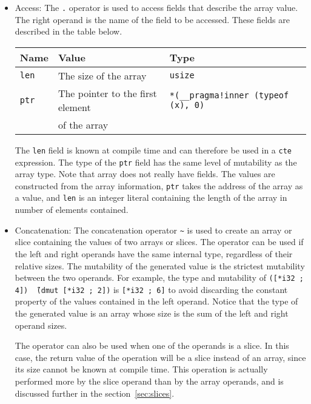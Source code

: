 \begin{itemize}
\item Access: The \texttt{.} operator is used to access fields that describe the
  array value. The right operand is the name of the field to be accessed. These
  fields are described in the table below.

\begin{center}\begin{adjustbox}{max width=\linewidth}
  \begin{tabular}{|l|ll|}
    \hline
    Name & Value & Type\\
    \hline
    \hline
    \texttt{len} & The size of the array & \texttt{usize} \\
    \texttt{ptr} & The pointer to the first element  & \texttt{*(\_\_pragma!inner (typeof (x), 0)} \\
    & of the array & \\
    \hline
  \end{tabular}
\end{adjustbox}\end{center}

The \texttt{len} field is known at compile time and can therefore be used in
a \texttt{cte} expression. The type of the \texttt{ptr} field has the same
level of mutability as the array type. Note that array does not really have
fields. The values are constructed from the array information, \texttt{ptr}
takes the address of the array as a value, and \texttt{len} is an integer
literal containing the length of the array in number of elements contained.

\item Concatenation: The concatenation operator \texttt{\~} is used to create an
  array or slice containing the values of two arrays or slices. The operator can
  be used if the left and right operands have the same internal type, regardless
  of their relative sizes. The mutability of the generated value is the
  strictest mutability between the two operands. For example, the type and
  mutability of \texttt{([*i32 ; 4]) \~\ (dmut [*i32 ; 2])} is \texttt{[*i32 ;
      6]} to avoid discarding the constant property of the values contained in
  the left operand. Notice that the type of the generated value is an array
  whose size is the sum of the left and right operand sizes.

  The operator can also be used when one of the operands is a slice. In this
  case, the return value of the operation will be a slice instead of an array,
  since its size cannot be known at compile time. This operation is actually
  performed more by the slice operand than by the array operands, and is
  discussed further in the section~\ref{sec:slices}.


\end{itemize}
